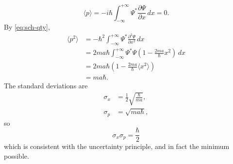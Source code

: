 \documentclass{article}
\begin{document}
\begin{enumerate}[(a)]
\begin{equation*}
      \langle p \rangle
      = -i\hbar\int_{-\infty}^{+\infty}
        \Psi^*\frac{\partial\Psi}{\partial x}
      \,dx
      = 0.
    \end{equation*}
    By \eqref{eq:sch-qty},
    \begin{align*}
      \langle p^2 \rangle
      &= -\hbar^2\int_{-\infty}^{+\infty}
        \Psi^*\frac{\partial^2\Psi}{\partial x^2}
      \,dx \\
      &= 2ma\hbar\int_{-\infty}^{+\infty}
      \Psi^*\Psi\left(1 - \frac{2ma}{\hbar}x^2\right)
      \,dx \\
      &= 2ma\hbar\left(1 - \frac{2ma}{\hbar}\langle x^2 \rangle\right) \\
      &= ma\hbar.
    \end{align*} The standard deviations are
    \begin{align*}
      \sigma_x &= \frac{1}{2}\sqrt{\frac{\hbar}{ma}}, \\
      \sigma_p &= \sqrt{ma\hbar},
    \end{align*}
    so \[ \sigma_x\sigma_p = \frac{\hbar}{2} \] which is consistent with the
    uncertainty principle, and in fact the minimum possible.
\end{enumerate}
\end{document}
